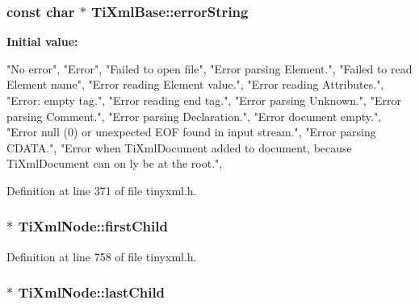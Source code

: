 \hypertarget{classTiXmlBase_a7ac8feec4100e446b3d78e1ac0659700}{
\subsubsection[{errorString}]{\setlength{\rightskip}{0pt plus 5cm}const char $\ast$ {\bf TiXmlBase::errorString}}}
\label{d8/d47/classTiXmlBase_a7ac8feec4100e446b3d78e1ac0659700}
{\bfseries Initial value:}
\begin{DoxyCode}

{
        "No error",
        "Error",
        "Failed to open file",
        "Error parsing Element.",
        "Failed to read Element name",
        "Error reading Element value.",
        "Error reading Attributes.",
        "Error: empty tag.",
        "Error reading end tag.",
        "Error parsing Unknown.",
        "Error parsing Comment.",
        "Error parsing Declaration.",
        "Error document empty.",
        "Error null (0) or unexpected EOF found in input stream.",
        "Error parsing CDATA.",
        "Error when TiXmlDocument added to document, because TiXmlDocument can on
      ly be at the root.",
}
\end{DoxyCode}


Definition at line 371 of file tinyxml.h.

\hypertarget{classTiXmlNode_af749fb7f22010b80e8f904c32653d50e}{
\subsubsection[{firstChild}]{$\ast$ {\bf TiXmlNode::firstChild}}}
\label{d3/dd5/classTiXmlNode_af749fb7f22010b80e8f904c32653d50e}


Definition at line 758 of file tinyxml.h.

\hypertarget{classTiXmlNode_a5b30756d21b304580d22a841ec9d61f8}{
\subsubsection[{lastChild}]{$\ast$ {\bf TiXmlNode::lastChild}}}
\label{d3/dd5/classTiXmlNode_a5b30756d21b304580d22a841ec9d61f8}


